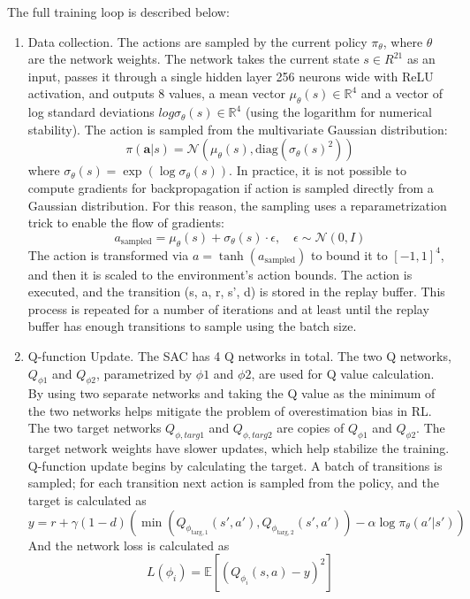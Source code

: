 \bigskip \noindent
The full training loop is described below:

\begin{enumerate}
  \item Data collection. The actions are sampled by the current policy $\pi_\theta$, where $\theta$ are the network weights. The network takes the current state $s \in R^{21}$ as an input, passes it through a single hidden layer 256 neurons wide with ReLU activation, and outputs 8 values, a mean vector $\mu_\theta(s) \in \mathbb{R}^4$ and a vector of log standard deviations $log\sigma_\theta(s) \in \mathbb{R}^4$ (using the logarithm for numerical stability). The action is sampled from the multivariate Gaussian distribution:
  \[
  \pi(\boldsymbol{a} | s) = \mathcal{N}(\mu_\theta(s), \text{diag}(\sigma_\theta(s)^2))
  \]
  where \(\sigma_\theta(s) = \exp(\log \sigma_\theta(s))\). In practice, it is not possible to compute gradients for backpropagation if action is sampled directly from a Gaussian distribution. For this reason, the sampling uses a reparametrization trick to enable the flow of gradients:
  \[
  a_\text{sampled} = \mu_\theta(s) + \sigma_\theta(s) \cdot \epsilon, \quad \epsilon \sim \mathcal{N}(0, I)
  \]
  The action is transformed via \(a = \tanh(a_{\text{sampled}})\) to bound it to \([-1, 1]^4\), and then it is scaled to the environment's action bounds. The action is executed, and the transition (s, a, r, s', d) is stored in the replay buffer. This process is repeated for a number of iterations and at least until the replay buffer has enough transitions to sample using the batch size.
  \item Q-function Update. The SAC has 4 Q networks in total. The two Q networks, $Q_{\phi1}$ and $Q_{\phi2}$, parametrized by $\phi1$ and $\phi2$, are used for Q value calculation. By using two separate networks and taking the Q value as the minimum of the two networks helps mitigate the problem of overestimation bias in RL. The two target networks $Q_{\phi,targ1}$ and $Q_{\phi,targ2}$ are copies of $Q_{\phi1}$ and $Q_{\phi2}$. The target network weights have slower updates, which help stabilize the training. Q-function update begins by calculating the target. A batch of transitions is sampled; for each transition next action is sampled from the policy, and the target is calculated as
  \[
  y = r + \gamma (1 - d) \left( \min(Q_{\phi_{\text{targ},1}}(s', a'), Q_{\phi_{\text{targ},2}}(s', a')) - \alpha \log \pi_\theta(a' | s') \right)
  \]
  And the network loss is calculated as
  \[
    L(\phi_i) = \mathbb{E}\left[ \left( Q_{\phi_i}(s, a) - y \right)^2 \right]
\]
\end{enumerate}
